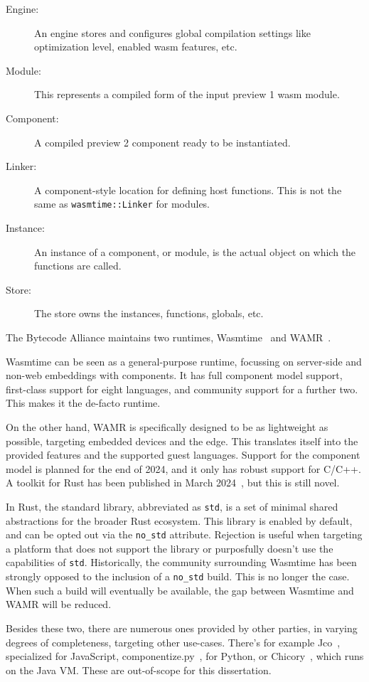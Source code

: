 \begin{description}
    \item[Engine:] An engine stores and configures global compilation settings like optimization level, enabled wasm features, etc.
    \item[Module:] This represents a compiled form of the input preview 1 wasm module.
    \item[Component:] A compiled preview 2 component ready to be instantiated.
    \item[Linker:] A component-style location for defining host functions. This is not the same as \texttt{wasmtime::Linker} for modules.
    \item[Instance:] An instance of a component, or module, is the actual object on which the functions are called.
    \item[Store:] The store owns the instances, functions, globals, etc.
\end{description}

The Bytecode Alliance maintains two runtimes, Wasmtime~\cite{wasmtime} and WAMR~\cite{gh:wamr}.

Wasmtime can be seen as a general-purpose runtime, focussing on server-side and non-web embeddings with components. It has full component model support, first-class support for eight languages, and community support for a further two. This makes it the de-facto runtime.

On the other hand, \gls{WAMR} is specifically designed to be as lightweight as possible, targeting embedded devices and the edge. This translates itself into the provided features and the supported guest languages. Support for the component model is planned for the end of 2024, and it only has robust support for C/C++. A toolkit for Rust has been published in March 2024~\cite{gh:wrsdk}, but this is still novel.

In Rust, the standard library, abbreviated as \texttt{std}, is a set of minimal shared abstractions for the broader Rust ecosystem. This library is enabled by default, and can be opted out via the \texttt{no\_std} attribute. Rejection is useful when targeting a platform that does not support the library or purposfully doesn't use the capabilities of \texttt{std}. Historically, the community surrounding Wasmtime has been strongly opposed to the inclusion of a \texttt{no\_std} build. This is no longer the case. When such a build will eventually be available, the gap between Wasmtime and \gls{WAMR} will be reduced.

Besides these two, there are numerous ones provided by other parties, in varying degrees of completeness, targeting other use-cases. There's for example Jco~\cite{jco}, specialized for JavaScript, componentize.py~\cite{gh:cpy}, for Python, or Chicory~\cite{yt:chicory}, which runs on the Java \gls{VM}. These are out-of-scope for this dissertation.


